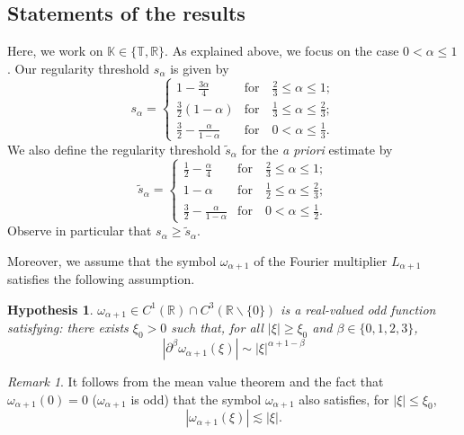 \documentclass{amsart}
\newtheorem{hypothesis}{Hypothesis}
\theoremstyle{definition}
\theoremstyle{remark}
\newtheorem{remark}[theorem]{Remark}
\def\R{{\mathbb R}}
\def\K{{\mathbb K}}
\newcommand{\T}{\mathbb{T}}
\numberwithin{equation}{section}
\begin{document}
\subsection{Statements of the results}

Here, we work on $\K\in\{\T, \R\}$. As explained above, we focus on the case $0<\alpha\le 1$. Our regularity threshold $s_{\alpha}$ is given by 
\begin{equation}\label{cond-s}
s_\alpha=\begin{cases}
 1-\frac{3\alpha}4 & \text{for} \quad \frac23 \le \alpha \le 1; \\ 
  \frac 32(1-\alpha) &  \text{for}  \quad \frac13 \le \alpha \le \frac23; \\ 
 \frac 32-\frac{\alpha}{1-\alpha}  & \text{for} \quad 0 < \alpha  \le \frac13 .
 \end{cases}
\end{equation}
We also define the regularity threshold $\widetilde{s}_\alpha$ for the \emph{a priori} estimate  by
\begin{equation}\label{cond-stilde}
\widetilde{s}_\alpha=\begin{cases}
 \frac 12-\frac \alpha 4 & \text{for} \quad \frac23 \le \alpha \le 1; \\ 
 1-\alpha &  \text{for}  \quad \frac12 \le \alpha \le \frac23; \\ 
 \frac 32-\frac{\alpha}{1-\alpha}  & \text{for} \quad 0 < \alpha  \le \frac12 .
 \end{cases}
\end{equation}
Observe in particular that $s_{\alpha} \ge \widetilde{s}_\alpha$. 


Moreover, we assume that the symbol $\omega_{\alpha+1}$ of the Fourier multiplier $L_{\alpha+1}$ satisfies the following assumption.
\begin{hypothesis}\label{hyp1}
$\omega_{\alpha+1}\in C^{1}(\R)\cap C^3(\R\backslash\{0\})$ is a real-valued odd function satisfying: there exists $\xi_0>0$ such that, for all $|\xi| \ge \xi_0$ and $\beta\in\{0,1,2,3\}$,
\begin{equation} \label{hyp1.1}
\left| \partial^\beta\omega_{\alpha+1}(\xi) \right| \sim |\xi|^{\alpha+1-\beta}
\end{equation} 
\end{hypothesis}

\begin{remark} \label{Rem:symb} It follows from the mean value theorem and the fact that $\omega_{\alpha+1}(0)=0$ ($\omega_{\alpha+1}$ is odd) that the symbol $\omega_{\alpha+1}$ also satisfies, for $|\xi| \le \xi_0$, 
\begin{equation} \label{hyp1.2}
\left| \omega_{\alpha+1}(\xi) \right| \lesssim |\xi| .
\end{equation} 
\end{remark}
\end{document}
